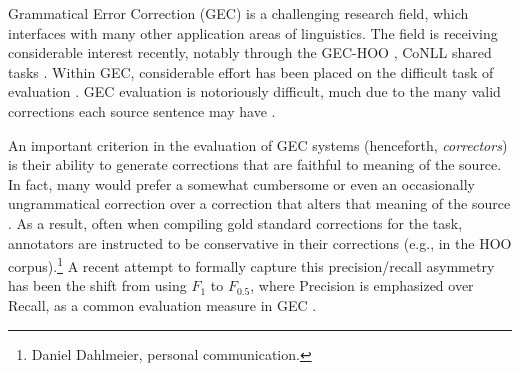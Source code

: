 \documentclass[letter,11pt]{article}
\begin{document}



Grammatical Error Correction (GEC) is a challenging research field, which interfaces with many other application areas of linguistics. The field is receiving considerable
interest recently, notably through the GEC-HOO \cite{dale2011helping,dale2012hoo},
CoNLL shared tasks \cite{kao2013conll,ng2014conll}.
Within GEC, considerable effort has been placed on the difficult task of
evaluation \cite{tetreault2008native,madnani2011they,chodorow2012problems,dahlmeier2012better}.
GEC evaluation is notoriously difficult, much due to the
many valid corrections each source sentence may have \cite{}.

An important criterion in the evaluation of GEC systems (henceforth, {\it correctors})
is their ability to generate corrections that are faithful to meaning of the
source. In fact, many would prefer
a somewhat cumbersome or even an occasionally ungrammatical correction over a correction
that alters that meaning of the source \cite{brockett2006correcting}.
As a result, often when compiling gold standard corrections for the task,
annotators are instructed to be conservative in their corrections (e.g., in the HOO
corpus).\footnote{Daniel Dahlmeier, personal communication.}
A recent attempt to formally capture this precision/recall asymmetry has
been the shift from using $F_1$ to $F_{0.5}$, where Precision is
emphasized over Recall, as a common evaluation measure
in GEC \cite{dahlmeier2012better}.
\end{document}
